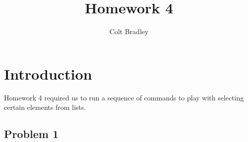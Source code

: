 \documentclass[11pt]{article}
\begin{document}
\title{Homework 4}
\author{Colt Bradley}
\date{}
\maketitle

\section{Introduction}
Homework 4 required us to run a sequence of commands to play with selecting certain elements from lists. 

\subsection{Problem 1}
\end{document}
